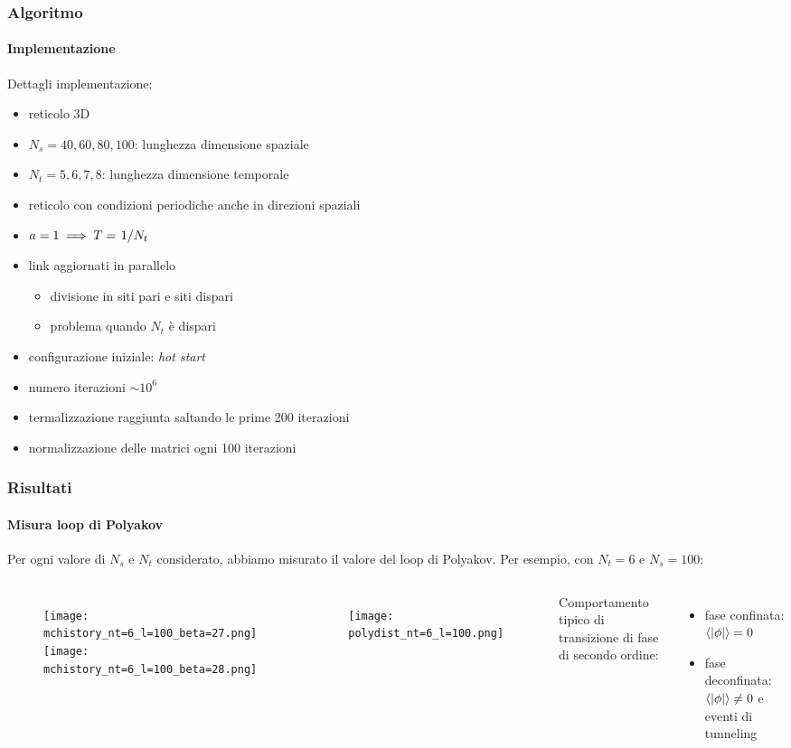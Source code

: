 \documentclass{beamer}
\begin{document}
\begin{frame}
	\frametitle{Algoritmo}
	\framesubtitle{Implementazione}

	Dettagli implementazione:

	\begin{itemize}
		\item reticolo 3D
		\item $N_s = 40,60,80,100$: lunghezza dimensione spaziale
		\item $N_t = 5,6,7,8$: lunghezza dimensione temporale
		\item reticolo con condizioni periodiche anche in direzioni spaziali
		\item $a = 1 \implies T = \flatfrac{1}{N_t}$
		\item link aggiornati in parallelo
			\begin{itemize}
				\item divisione in siti pari e siti dispari
				\item problema quando $N_t$ è dispari
			\end{itemize}
		\item configurazione iniziale: \textit{hot start}
		\item numero iterazioni $\sim 10^6$
		\item termalizzazione raggiunta saltando le prime 200 iterazioni
		\item normalizzazione delle matrici ogni 100 iterazioni
	\end{itemize}

\end{frame}

\begin{frame}
	\frametitle{Risultati}
	\framesubtitle{Misura loop di Polyakov}

	Per ogni valore di $N_s$ e $N_t$ considerato, abbiamo misurato il valore del loop di Polyakov. 
	Per esempio, con $N_t = 6$ e $N_s = 100$:

	\begin{columns}
			\begin{figure}[h]
				\centering
				\vspace{-1em}
				\texttt{[image: mchistory\_nt=6\_l=100\_beta=27.png]}
				\texttt{[image: mchistory\_nt=6\_l=100\_beta=28.png]}
			\end{figure}
			
			\begin{figure}[h]
				\texttt{[image: polydist\_nt=6\_l=100.png]}
			\end{figure}

			Comportamento tipico di transizione di fase di secondo ordine:
			\begin{itemize}
				\item fase confinata: $\expval{|\phi|} = 0$
				\item fase deconfinata: $\expval{|\phi|} \ne 0$ e \alert{eventi di tunneling}
			\end{itemize}
			
	\end{columns}
	

\end{frame}
\end{document}
